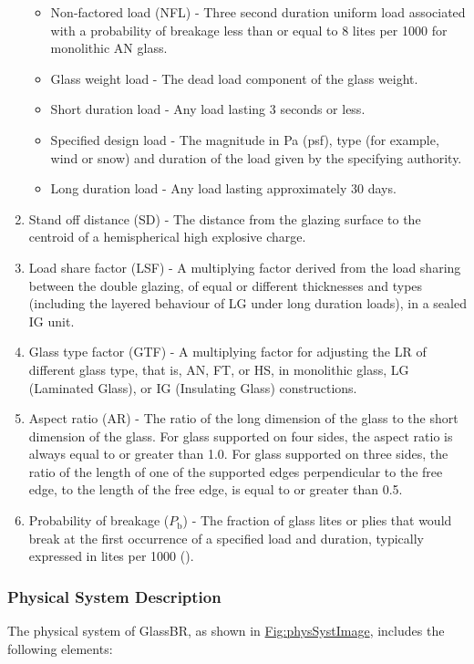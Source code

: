 \documentclass[12pt]{article}
\begin{document}
\begin{enumerate}
\begin{itemize}
\item{Non-factored load (NFL) - Three second duration uniform load associated with a probability of breakage less than or equal to 8 lites per 1000 for monolithic AN glass.}
\item{Glass weight load - The dead load component of the glass weight.}
\item{Short duration load - Any load lasting 3 seconds or less.}
\item{Specified design load - The magnitude in Pa (psf), type (for example, wind or snow) and duration of the load given by the specifying authority.}
\item{Long duration load - Any load lasting approximately 30 days.}
\end{itemize}
\item{Stand off distance (SD) - The distance from the glazing surface to the centroid of a hemispherical high explosive charge.}
\item{Load share factor (LSF) - A multiplying factor derived from the load sharing between the double glazing, of equal or different thicknesses and types (including the layered behaviour of LG under long duration loads), in a sealed IG unit.}
\item{Glass type factor (GTF) - A multiplying factor for adjusting the LR of different glass type, that is, AN, FT, or HS, in monolithic glass, LG (Laminated Glass), or IG (Insulating Glass) constructions.}
\item{Aspect ratio (AR) - The ratio of the long dimension of the glass to the short dimension of the glass. For glass supported on four sides, the aspect ratio is always equal to or greater than 1.0. For glass supported on three sides, the ratio of the length of one of the supported edges perpendicular to the free edge, to the length of the free edge, is equal to or greater than 0.5.}
\item{Probability of breakage (${P_{\text{b}}}$) - The fraction of glass lites or plies that would break at the first occurrence of a specified load and duration, typically expressed in lites per 1000 (\cite{astm2016}).}
\end{enumerate}
\subsubsection{Physical System Description}
\label{Sec:PhysSyst}
The physical system of GlassBR, as shown in \hyperref[Figure:physSystImage]{Fig:physSystImage}, includes the following elements:
\end{document}
